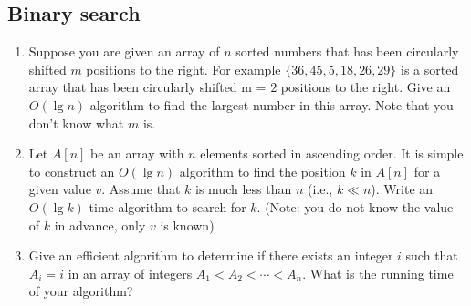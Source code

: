 \subsection{Binary search}
\begin{Exercise}
\begin{enumerate}
\item Suppose you are given an array of $n$ sorted numbers that has been circularly shifted $m$ positions to the right. For example $\{36, 45, 5, 18, 26, 29\}$ is a sorted array that has been circularly shifted m = $2$ positions to the right. Give an $O(\lg n)$ algorithm to find the largest number in this array. Note that you don't know what $m$ is. 
\item Let $A[n]$ be an array with $n$ elements sorted in ascending order. It is simple to construct an $O(\lg n)$ algorithm to find the position $k$ in $A[n]$ for a given value $v$. Assume that $k$ is much less than $n$ (i.e., $k \ll n$). Write an $O(\lg k)$ time algorithm to search for $k$.
(Note: you do not know the value of $k$ in advance, only $v$ is known) 
\item Give an efficient algorithm to determine if there exists an integer $i$ such that $A_i = i$ in an array of integers $A_1 < A_2 < \cdots < A_n$. What is the running time of your algorithm? 
\end{enumerate}
\end{Exercise}
\begin{Answer}
\end{Answer}

